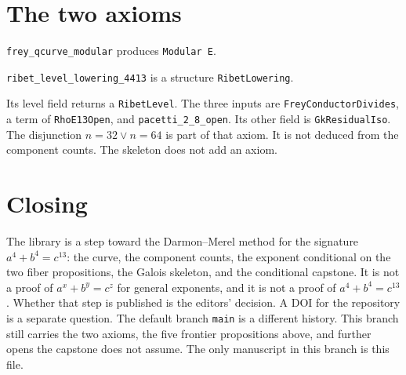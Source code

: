 \documentclass[11pt]{amsart}
\begin{document}
\section{The two axioms}
\texttt{frey\_qcurve\_modular} produces \texttt{Modular E}.

\texttt{ribet\_level\_lowering\_4413} is a structure \texttt{RibetLowering}.

Its level field returns a \texttt{RibetLevel}.
The three inputs are \texttt{FreyConductorDivides}, a term of \texttt{RhoE13Open}, and \texttt{pacetti\_2\_8\_open}.
Its other field is \texttt{GkResidualIso}.
The disjunction $n=32\lor n=64$ is part of that axiom. It is not deduced from the component counts.
The skeleton does not add an axiom.

\section{Closing}
The library is a step toward the Darmon--Merel method for the signature $a^4+b^4=c^{13}$: the curve, the component counts, the exponent conditional on the two fiber propositions, the Galois skeleton, and the conditional capstone.
It is not a proof of $a^x+b^y=c^z$ for general exponents, and it is not a proof of $a^4+b^4=c^{13}$.
Whether that step is published is the editors' decision.
A DOI for the repository is a separate question.
The default branch \texttt{main} is a different history.
This branch still carries the two axioms, the five frontier propositions above, and further opens the capstone does not assume.
The only manuscript in this branch is this file.
\end{document}
